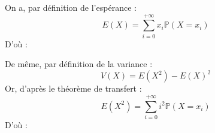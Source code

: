 
\bigskip

On a, par définition de l'espérance :
\[
  E(X) = \sum\limits_{i=0}^{+\infty}x_i\mathbb{P}(X=x_i)
\]
D'où :


\bigskip
De même, par définition de la variance :
\[
  V(X) = E(X^2) - E(X)^2
\]
Or, d'après le théorème de transfert :
\[
  E(X^2) = \sum\limits_{i=0}^{+\infty}i^2\mathbb{P}(X=x_i)
\]
D'où :

